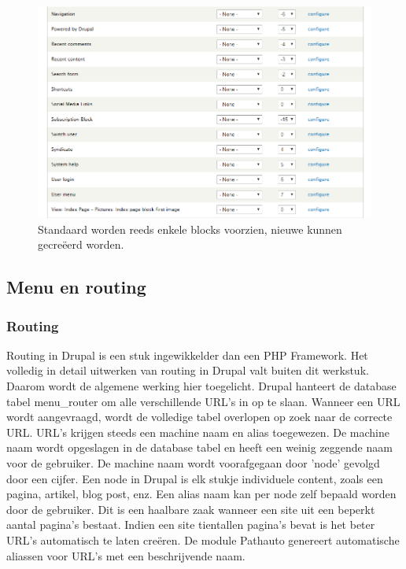 \begin{figure}[!ht]
  \includegraphics[width=\textwidth]{img/dr-theme-blocks-created.png}
  \caption{Standaard worden reeds enkele blocks voorzien, nieuwe kunnen gecreëerd worden.}
  \label{fig:Drupal thema standaard Blocks.}
\end{figure}

\pagebreak

\subsection{Menu en routing}
\subsubsection{Routing}
Routing in Drupal is een stuk ingewikkelder dan een PHP Framework. Het volledig in detail uitwerken van routing in Drupal valt buiten dit werkstuk. Daarom wordt de algemene werking hier toegelicht.
\newline\newline
Drupal hanteert de database tabel menu\_router om alle verschillende URL's in op te slaan. Wanneer een URL wordt aangevraagd, wordt de volledige tabel overlopen op zoek naar de correcte URL. URL's krijgen steeds een machine naam en alias toegewezen. De machine naam wordt opgeslagen in de database tabel en heeft een weinig zeggende naam voor de gebruiker. De machine naam wordt voorafgegaan door 'node' gevolgd door een cijfer. Een node in Drupal is elk stukje individuele content, zoals een pagina, artikel, blog post, enz. Een alias naam kan per node zelf bepaald worden door de gebruiker. Dit is een haalbare zaak wanneer een site uit een beperkt aantal pagina's bestaat. Indien een site tientallen pagina's bevat is het beter URL's automatisch te laten creëren. De module Pathauto genereert automatische aliassen voor URL's met een beschrijvende naam.

